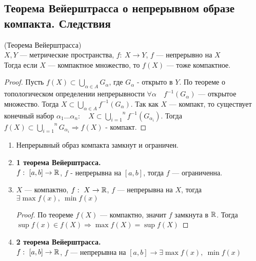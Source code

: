 \subsection{Теорема Вейерштрасса о непрерывном образе компакта. Следствия}
\begin{theorem*} (Теорема Вейерштрасса) \\
$X, Y$ --- метрические пространства, $f: \ X \rightarrow Y$, $f$ --- непрерывно на $X$\\
Тогда если $X$ --- компактное множество, то $f(X)$ --- тоже компактное.
\end{theorem*}

\begin{proof}
Пусть $f(X) \subset \underset{\alpha \in A}{\bigcup} G_\alpha$, где $G_\alpha$ - открыто в $Y$. По теореме о топологическом определении непрерывности $\forall \alpha \quad f^{-1}(G_\alpha)$ --- открытое множество. Тогда $X \subset \underset{\alpha \in A}{\bigcup} f^{-1}(G_\alpha)$. Так как $X$ --- компакт, то существует конечный набор $\alpha_1 \dots \alpha_n: \quad X \subset \overset{n}{\underset{i = 1}{\bigcup}} f^{-1}(G_{\alpha_i})$. Тогда $f(X) \subset \overset{n}{\underset{i = 1}{\bigcup}} G_{\alpha_i} \Rightarrow f(X)$ - компакт.
\end{proof}

\begin{consequence}
\begin{enumerate}
    \item Непрерывный образ компакта замкнут и ограничен. %
    \item \textbf{1 теорема Вейерштрасса.}\\
    $f: \ [a, b] \rightarrow \operatorname*{\mathbb{R}}$, $f$ - непрерывна на $[a, b]$, тогда $f$ --- ограниченна. %
    \item $X$ --- компактно, $f: \  X \rightarrow \operatorname*{\mathbb{R}}$, $f$ --- непрерывна на $X$, тогда $\exists \max f(x), \  \min f(x)$ \\
    \begin{proof}
    По теореме $f(X)$ --- компактно, значит $f$ замкнута в $\operatorname*{\mathbb{R}}$. Тогда $\sup f(x) \in f(X) \Rightarrow \max f(X) = \sup f(X)$ %
    \end{proof}
    \item \textbf{2 теорема Вейерштрасса.} \\
    $f: \  [a, b] \rightarrow \operatorname*{\mathbb{R}}$, $f$ --- непрерывна на $[a, b] \rightarrow \exists \max f(x), \  \min f(x)$
\end{enumerate}
\end{consequence}

